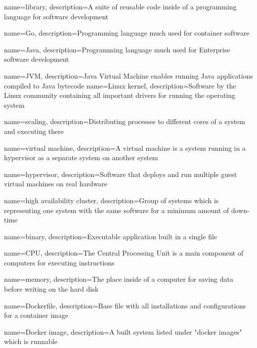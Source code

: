 {
    name={library},
    description={A suite of reusable code inside of a programming language for software development}
}

{
    name={Go},
    description={Programming language much used for container software}
}

{
    name={Java},
    description={Programming language much used for Enterprise software development}
}

{
    name={JVM},
    description={Java Virtual Machine enables running Java applications compiled to Java bytecode}
}
{
    name={Linux kernel},
    description={Software by the Linux community containing all important drivers for running the operating system}
}

{
    name={scaling},
    description={Distributing processes to different cores of a system and executing there}
}

{
    name={virtual machine},
    description={A virtual machine is a system running in a hypervisor as a separate system on another system}
}

{
    name={hypervisor},
    description={Software that deploys and run multiple guest virtual machines on real hardware}
}

{
    name={high availability cluster},
    description={Group of systems which is representing one system with the same software for a minimum amount of down-time}
}

{
    name={binary},
    description={Executable application built in a single file}
}

{
    name={CPU},
    description={The Central Processing Unit is a main component of computers for executing instructions}
}

{
    name={memory},
    description={The place inside of a computer for saving data before writing on the hard disk}
}


{
    name={Dockerfile},
    description={Base file with all installations and configurations for a container image}
}

{
    name={Docker image},
    description={A built system listed under "docker images" which is runnable}
}

